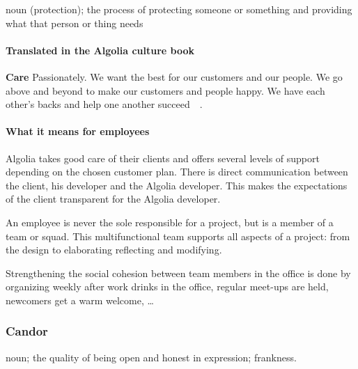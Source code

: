 \begin{definition}
noun (protection); the process of protecting someone or something and providing what that person or thing needs
\end{definition}


\paragraph{Translated in the Algolia culture book}

\textbf{Care} Passionately. We want the best for our customers and our people. We go above and beyond to make our customers and people happy. We have each other's backs and help one another succeed~\cite{algolia-careers}~.

\paragraph{What it means for employees} 

Algolia takes good care of their clients and offers several levels of support depending on the chosen customer plan. There is direct communication between the client, his developer and the Algolia developer. This makes the expectations of the client transparent for the Algolia developer.

An employee is never the sole responsible for a project, but is a member of a team or squad. This multifunctional team supports all aspects of a project: from the design to elaborating reflecting and modifying.

Strengthening the social cohesion between team members in the office is done by organizing weekly after work drinks in the office, regular meet-ups are held, newcomers get a warm welcome, \dots

\subsubsection{Candor}
\label{ssub:candor}

\begin{definition}
noun; the quality of being open and honest in expression; frankness.
\end{definition}


